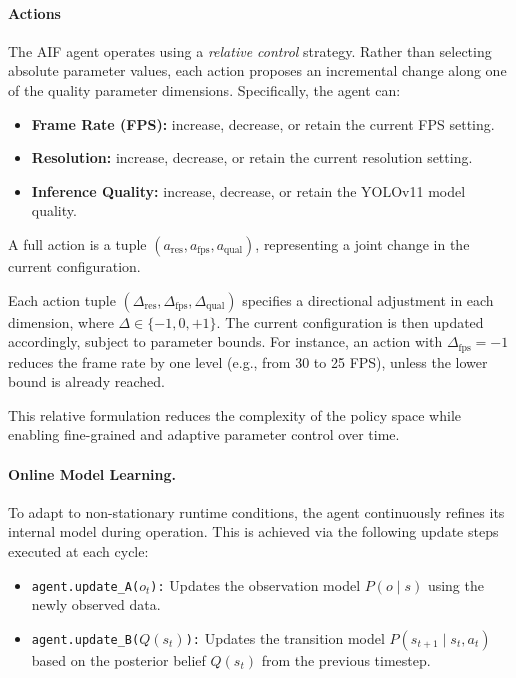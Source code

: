 \paragraph{Actions}
The AIF agent operates using a \textit{relative control} strategy. Rather than selecting absolute parameter values, each action proposes an incremental change along one of the quality parameter dimensions. Specifically, the agent can:

\begin{itemize}
  \item \textbf{Frame Rate (FPS):} increase, decrease, or retain the current FPS setting.
  \item \textbf{Resolution:} increase, decrease, or retain the current resolution setting.
  \item \textbf{Inference Quality:} increase, decrease, or retain the YOLOv11 model quality.
\end{itemize}

A full action is a tuple $(a_\text{res}, a_\text{fps}, a_\text{qual})$, representing a joint change in the current configuration.

Each action tuple $(\Delta_\text{res}, \Delta_\text{fps}, \Delta_\text{qual})$ specifies a directional adjustment in each dimension, where \(\Delta \in \{-1, 0, +1\}\). The current configuration is then updated accordingly, subject to parameter bounds. For instance, an action with \(\Delta_\text{fps} = -1\) reduces the frame rate by one level (e.g., from 30 to 25 FPS), unless the lower bound is already reached.

This relative formulation reduces the complexity of the policy space while enabling fine-grained and adaptive parameter control over time.

\paragraph{Online Model Learning.}
To adapt to non-stationary runtime conditions, the agent continuously refines its internal model during operation. This is achieved via the following update steps executed at each cycle:

\begin{itemize}
  \item \texttt{agent.update\_A(\(o_t\)):} Updates the observation model \( P(o \mid s) \) using the newly observed data.
  \item \texttt{agent.update\_B(\(Q(s_t)\)):} Updates the transition model \( P(s_{t+1} \mid s_t, a_t) \) based on the posterior belief \(Q(s_{t})\) from the previous timestep.
\end{itemize}

